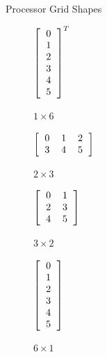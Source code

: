\begin{frame}
\begin{block}{Processor Grid Shapes}
\begin{table}[ht]
        \centering
        \begin{subfigure}[b]{0.23\textwidth}
                \centering
              $\left[\begin{tabular}{l}
                  0 \\ 1 \\ 2 \\ 3 \\ 4 \\ 5
                \end{tabular}\right]^T$
                \caption{$1\times 6$}
        \end{subfigure}
        \begin{subfigure}[b]{0.23\textwidth}
                \centering
                $\left[\begin{tabular}{lll}
                  0 & 1 & 2\\
                  3 & 4 & 5
                \end{tabular}\right]$
                \caption{$2\times 3$}
        \end{subfigure}%
        \begin{subfigure}[b]{0.23\textwidth}
                \centering
              $\left[\begin{tabular}{ll}
                  0 & 1 \\
                  2 & 3\\
                  4 & 5
                \end{tabular}\right]$
                \caption{$3\times 2$}
        \end{subfigure}
        \begin{subfigure}[b]{0.23\textwidth}
                \centering
              $\left[\begin{tabular}{l}
                  0 \\ 1 \\ 2 \\ 3 \\ 4 \\ 5
                \end{tabular}\right]$
                \caption{$6\times 1$}
        \end{subfigure}
        \caption{Processor Grid Shapes with 6 Processors}\label{fig:gridshapes}
\end{table}
\end{block}
\end{frame}





